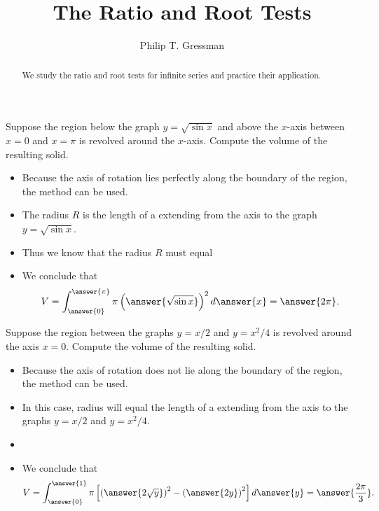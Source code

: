 \documentclass{ximera}
\title{The Ratio and Root Tests}
\author{Philip T. Gressman}
\begin{document}
\begin{abstract}
We study the ratio and root tests for infinite series and practice their application.
\end{abstract}
\maketitle

\begin{example}
Suppose the region below the graph $y = \sqrt{\sin x}$ and above the $x$-axis between $x=0$ and $x=\pi$ is revolved around the $x$-axis. Compute the volume of the resulting solid.
\begin{itemize}
\item Because the axis of rotation lies perfectly along the boundary of the region, the  method can be used.
\item The radius $R$ is the length of a  extending from the axis to the graph $y = \sqrt{\sin x}$.
\item Thus we know that the radius $R$ must equal
\begin{multipleChoice}\end{multipleChoice}
\item We conclude that
\[ V = \int_{\answer{0}}^{\answer{\pi}} \pi \left( \answer{\sqrt{\sin x}} \right)^2 d\answer{x} = \answer{2\pi}. \]
\end{itemize}
\end{example}

\begin{example}
Suppose the region between the graphs $y = x/2$ and $y=x^2/4$ is revolved around the axis $x=0$. Compute the volume of the resulting solid.

\begin{itemize}
\item Because the axis of rotation does not lie along the boundary of the region, the  method can be used.
\item In this case, radius will equal the length of a  extending from the axis to the graphs $y = x/2$ and $y = x^2/4$.
\item 
\begin{multipleChoice}
\end{multipleChoice}
\item We conclude that
\[ V = \int_{\answer{0}}^{\answer{1}} \pi \left[  \left( \answer{2 \sqrt{y}} \right)^2 - \left( \answer{2 y} \right)^2  \right] d\answer{y} = \answer{\frac{2 \pi}{3}}. \]
\end{itemize}
\end{example}
\end{document}
